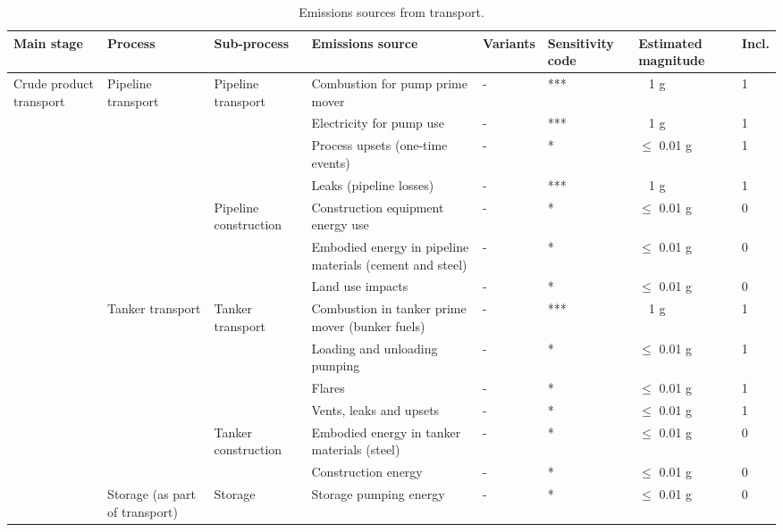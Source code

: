 \documentclass[11pt]{report}
\begin{document}
\begin{landscape}
\begin{table}
\begin{scriptsize}
\caption{Emissions sources from transport.}
\label{tab:transport_sources}
\begin{tabular}{|p{}|p{}|p{}|p{}|p{}|p{}|p{}|p{}|}
\hline
\textbf{Main stage} & \textbf{Process} & \textbf{Sub-process} & \textbf{Emissions source} & \textbf{Variants}& \textbf{Sensitivity code} & \textbf{Estimated magnitude} & \textbf{Incl.}\\
\hline
\multirow{18}{0.08\columnwidth}{Crude product transport} & \multirow{7}{0.09\columnwidth}{Pipeline transport} & \multirow{4}{0.12\columnwidth}{Pipeline transport} & Combustion for pump prime mover & - & *** & ~ 1 g & 1\\
\cline{4-8}
& & & Electricity for pump use & - & *** & ~ 1 g & 1\\
\cline{4-8}
& & & Process upsets (one-time events) & - & * & $\leq$ 0.01 g & 1\\
\cline{4-8}
& & & Leaks (pipeline losses) & - & *** & ~ 1 g & 1\\
\cline{3-8}
& & \multirow{3}{0.12\columnwidth}{Pipeline construction} & Construction equipment energy use & - & * & $\leq$ 0.01 g & 0\\
\cline{4-8}
& & & Embodied energy in pipeline materials (cement and steel) & - & * & $\leq$ 0.01 g & 0\\
\cline{4-8}
& & & Land use impacts & - & * & $\leq$ 0.01 g & 0\\
\cline{2-8}
& \multirow{6}{0.09\columnwidth}{Tanker transport} & \multirow{4}{0.12\columnwidth}{Tanker transport} & Combustion in tanker prime mover (bunker fuels) & - & *** & ~ 1 g & 1\\
\cline{4-8}
& & & Loading and unloading pumping & - & * & $\leq$ 0.01 g & 1\\
\cline{4-8}
& & & Flares & - & * & $\leq$ 0.01 g & 1\\
\cline{4-8}
& & & Vents, leaks and upsets & - & * & $\leq$ 0.01 g & 1\\
\cline{3-8}
& & \multirow{2}{0.12\columnwidth}{Tanker construction} & Embodied energy in tanker materials (steel) & - & * & $\leq$ 0.01 g & 0\\
\cline{4-8}
& & & Construction energy & - & * & $\leq$ 0.01 g & 0\\
\cline{2-8}
& \multirow{5}{0.09\columnwidth}{Storage (as part of transport)} & \multirow{5}{0.12\columnwidth}{Storage} & Storage pumping energy & - & * & $\leq$ 0.01 g & 0\\

\end{tabular}
\end{scriptsize}
\end{table}
\end{landscape}
\end{document}
